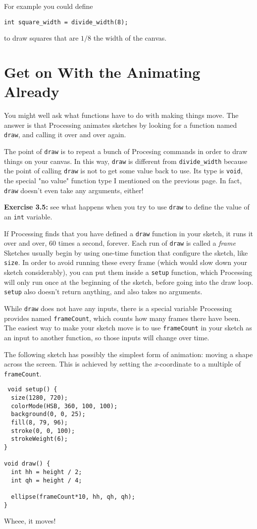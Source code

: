 \documentclass[
]{leaflet}
\begin{document}
For example you could define
\begin{lstlisting}
int square_width = divide_width(8);
\end{lstlisting}
\vspace{-0.5em}
to draw squares that are $1/8$ the width of the canvas.

\section{Get on With the Animating Already}

You might well ask what functions have to do with making things move.
The answer is that Processing animates sketches by looking for a function named \texttt{draw}, and calling it over and over again.

The point of \texttt{draw} is to repeat a bunch of Procesing commands in order to draw things on your canvas.
In this way, \texttt{draw} is different from \texttt{divide\_width} because the point of calling \texttt{draw} is not to get some value back to use.
Its type is \texttt{void}, the special "no value" function type I mentioned on the previous page.
In fact, \texttt{draw} doesn't even take any arguments, either!

\textbf{Exercise 3.5:} see what happens when you try to use \texttt{draw} to define the value of an \texttt{int} variable.

If Processing finds that you have defined a \texttt{draw} function in your sketch, it runs it over and over, 60 times a second, forever.
Each run of \texttt{draw} is called a \textit{frame}
Sketches usually begin by using one-time function that configure the sketch, like \texttt{size}.
In order to avoid running these every frame (which would slow down your sketch considerably), you can put them inside a \texttt{setup} function, which Processing will only run once at the beginning of the sketch, before going into the draw loop.
\texttt{setup} also doesn't return anything, and also takes no arguments.

While \texttt{draw} does not have any inputs, there is a special variable Processing provides named \texttt{frameCount}, which counts how many frames there have been.
The easiest way to make your sketch move is to use \texttt{frameCount} in your sketch as an input to another function, so those inputs will change over time.

The following sketch has possibly the simplest form of animation: moving a shape across the screen.
This is achieved by setting the \textit{x}-coordinate to a multiple of \texttt{frameCount}.
\begin{lstlisting}
 void setup() {
  size(1280, 720);
  colorMode(HSB, 360, 100, 100);
  background(0, 0, 25);
  fill(8, 79, 96);
  stroke(0, 0, 100);
  strokeWeight(6);
}

void draw() {
  int hh = height / 2;
  int qh = height / 4;

  ellipse(frameCount*10, hh, qh, qh);
}
\end{lstlisting}
Wheee, it moves!

\loggingall
\end{document}
